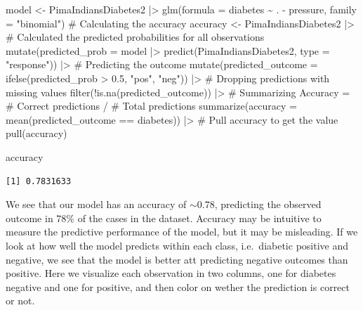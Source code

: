 \documentclass[
  letterpaper,
  DIV=11,
  numbers=noendperiod]{scrreprt}
\newenvironment{Shaded}{\begin{snugshade}}{\end{snugshade}}
\newcommand{\AttributeTok}[1]{\textcolor[rgb]{0.40,0.45,0.13}{#1}}
\newcommand{\CommentTok}[1]{\textcolor[rgb]{0.37,0.37,0.37}{#1}}
\newcommand{\FloatTok}[1]{\textcolor[rgb]{0.68,0.00,0.00}{#1}}
\newcommand{\FunctionTok}[1]{\textcolor[rgb]{0.28,0.35,0.67}{#1}}
\newcommand{\NormalTok}[1]{\textcolor[rgb]{0.00,0.23,0.31}{#1}}
\newcommand{\OtherTok}[1]{\textcolor[rgb]{0.00,0.23,0.31}{#1}}
\newcommand{\SpecialCharTok}[1]{\textcolor[rgb]{0.37,0.37,0.37}{#1}}
\newcommand{\StringTok}[1]{\textcolor[rgb]{0.13,0.47,0.30}{#1}}
\begin{document}
\begin{Shaded}
\begin{Highlighting}[]
\NormalTok{model }\OtherTok{\textless{}{-}}\NormalTok{ PimaIndiansDiabetes2 }\SpecialCharTok{|\textgreater{}} 
  \FunctionTok{glm}\NormalTok{(}\AttributeTok{formula =}\NormalTok{ diabetes }\SpecialCharTok{\textasciitilde{}}\NormalTok{ . }\SpecialCharTok{{-}}\NormalTok{ pressure, }\AttributeTok{family =} \StringTok{"binomial"}\NormalTok{)}
\CommentTok{\# Calculating the accuracy}
\NormalTok{accuracy }\OtherTok{\textless{}{-}}\NormalTok{ PimaIndiansDiabetes2 }\SpecialCharTok{|\textgreater{}} 
  \CommentTok{\# Calculated the predicted probabilities for all observations}
  \FunctionTok{mutate}\NormalTok{(}\AttributeTok{predicted\_prob =}\NormalTok{ model }\SpecialCharTok{|\textgreater{}} \FunctionTok{predict}\NormalTok{(PimaIndiansDiabetes2, }\AttributeTok{type =} \StringTok{"response"}\NormalTok{)) }\SpecialCharTok{|\textgreater{}} 
  \CommentTok{\# Predicting the outcome}
  \FunctionTok{mutate}\NormalTok{(}\AttributeTok{predicted\_outcome =} \FunctionTok{ifelse}\NormalTok{(predicted\_prob }\SpecialCharTok{\textgreater{}} \FloatTok{0.5}\NormalTok{, }\StringTok{"pos"}\NormalTok{, }\StringTok{"neg"}\NormalTok{)) }\SpecialCharTok{|\textgreater{}} 
  \CommentTok{\# Dropping predictions with missing values}
  \FunctionTok{filter}\NormalTok{(}\SpecialCharTok{!}\FunctionTok{is.na}\NormalTok{(predicted\_outcome)) }\SpecialCharTok{|\textgreater{}} 
  \CommentTok{\# Summarizing Accuracy = \# Correct predictions / \# Total predictions}
  \FunctionTok{summarize}\NormalTok{(}\AttributeTok{accuracy =} \FunctionTok{mean}\NormalTok{(predicted\_outcome }\SpecialCharTok{==}\NormalTok{ diabetes)) }\SpecialCharTok{|\textgreater{}}
  \CommentTok{\# Pull accuracy to get the value}
  \FunctionTok{pull}\NormalTok{(accuracy)}

\NormalTok{accuracy}
\end{Highlighting}
\end{Shaded}

\begin{verbatim}
[1] 0.7831633
\end{verbatim}

We see that our model has an accuracy of \(\sim 0.78\), predicting the
observed outcome in 78\% of the cases in the dataset. Accuracy may be
intuitive to measure the predictive performance of the model, but it may
be misleading. If we look at how well the model predicts within each
class, i.e.~diabetic positive and negative, we see that the model is
better att predicting negative outcomes than positive. Here we visualize
each observation in two columns, one for diabetes negative and one for
positive, and then color on wether the prediction is correct or not.
\end{document}
